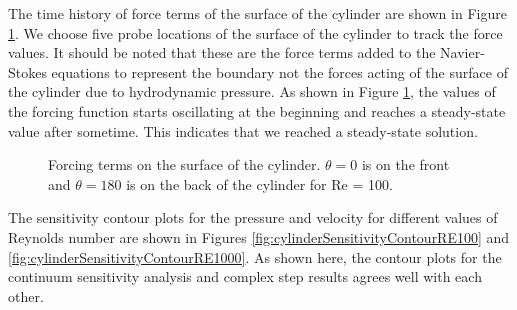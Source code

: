 \documentclass{aiaa-pretty}
\begin{document}
The time history of force terms of the surface of the cylinder are shown in Figure \ref{fig:cylinderForceTerms}. We choose five probe locations of the surface of the cylinder to track the force values. It should be noted that these are the force terms added to the Navier-Stokes equations to represent the boundary not the forces acting of the surface of the cylinder due to hydrodynamic pressure. As shown in Figure \ref{fig:cylinderForceTerms}, the values of the forcing function starts oscillating at the beginning and reaches a steady-state value after sometime. This indicates that we reached a steady-state solution.

%
\begin{figure}[H]
	\centering
	\quad
	\caption{Forcing terms on the surface of the cylinder. $\theta = 0$ is on the front and $\theta = 180$ is on the back of the cylinder for Re = 100.}
	\label{fig:cylinderForceTerms}
\end{figure}
%

The sensitivity contour plots for the pressure and velocity for different values of Reynolds number are shown in Figures \ref{fig:cylinderSensitivityContourRE100} and \ref{fig:cylinderSensitivityContourRE1000}. As shown here, the contour plots for the continuum sensitivity analysis and complex step results agrees well with each other.
\end{document}
